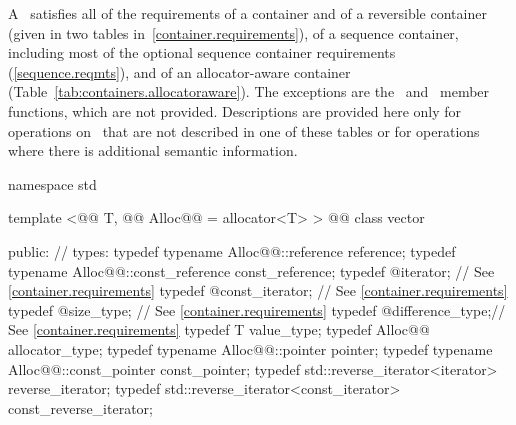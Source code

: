 \documentclass[american,twoside]{book}
\begin{document}
\pnum
A \ satisfies all of the requirements of a container and of a reversible container (given in two tables in~\ref{container.requirements}), of a sequence container, including most of the optional sequence container requirements (\ref{sequence.reqmts}), and of an allocator-aware container (Table~\ref{tab:containers.allocatoraware}). The exceptions are the \ and \ member functions, which are not provided. Descriptions are provided here only for operations on \ that are not described in one of these tables or for operations where there is additional semantic information.

\begin{codeblock}
namespace std {
  template <@@ T, @@ Alloc@@ = allocator<T> >
  @@
  class vector {
  public:
    // types:
    typedef typename Alloc@@::reference         reference;
    typedef typename Alloc@@::const_reference   const_reference;
    typedef @\impdef@                iterator;       // See \ref{container.requirements}
    typedef @\impdef@                const_iterator; // See \ref{container.requirements}
    typedef @\impdef@                size_type;      // See \ref{container.requirements}
    typedef @\impdef@                difference_type;// See \ref{container.requirements}
    typedef T                                     value_type;
    typedef Alloc@@                             allocator_type;
    typedef typename Alloc@@::pointer           pointer;
    typedef typename Alloc@@::const_pointer     const_pointer;
    typedef std::reverse_iterator<iterator>       reverse_iterator;
    typedef std::reverse_iterator<const_iterator> const_reverse_iterator;

}}
\end{codeblock}
\end{document}
